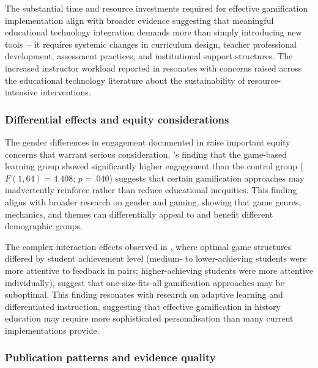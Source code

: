 \documentclass[a4paper,fleqn]{cas-sc}
\begin{document}
The substantial time and resource investments required for effective gamification implementation \citep{4Cruz2017, 8Yu2014, 14Forsyth2023, 20Erandaru2014, 42Huffer201581, 50Lye2013, 53Perez2014, 60Hoy2018, 64Hsu201324, 75trajano2014using} align with broader evidence suggesting that meaningful educational technology integration demands more than simply introducing new tools~-- it requires systemic changes in curriculum design, teacher professional development, assessment practices, and institutional support structures. The increased instructor workload reported in \citet{8Yu2014} resonates with concerns raised across the educational technology literature about the sustainability of resource-intensive interventions.

\subsubsection{Differential effects and equity considerations}

The gender differences in engagement documented in \citep{8Yu2014, 66Rahmawati2023163} raise important equity concerns that warrant serious consideration. \citeauthor{66Rahmawati2023163}'s \citeyearpar{66Rahmawati2023163} finding that the game-based learning group showed significantly higher engagement than the control group ($F(1,64)=4.408$; $p=.040$) suggests that certain gamification approaches may inadvertently reinforce rather than reduce educational inequities. This finding aligns with broader research on gender and gaming, showing that game genres, mechanics, and themes can differentially appeal to and benefit different demographic groups.

The complex interaction effects observed in \citet{11Ternblad2023115}, where optimal game structures differed by student achievement level (medium- to lower-achieving students were more attentive to feedback in pairs; higher-achieving students were more attentive individually), suggest that one-size-fits-all gamification approaches may be suboptimal. This finding resonates with research on adaptive learning and differentiated instruction, suggesting that effective gamification in history education may require more sophisticated personalisation than many current implementations provide.

\subsubsection{Publication patterns and evidence quality}
\end{document}
